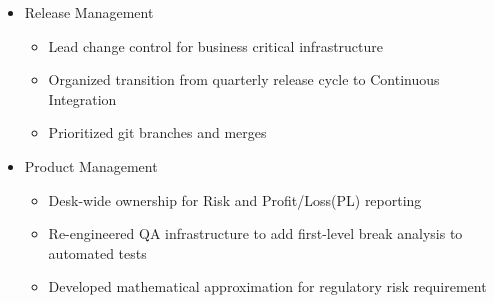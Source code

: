 \begin{itemize}
    \item Release Management
        \begin{itemize}
            \item Lead change control for business critical infrastructure
            \item Organized transition from quarterly release cycle to Continuous Integration
            \item Prioritized git branches and merges
        \end{itemize}

    \item{Product Management}
        \begin{itemize}
            \item Desk-wide ownership for Risk and Profit/Loss(PL) reporting
            \item Re-engineered QA infrastructure to add first-level break analysis to automated tests
            \item Developed mathematical approximation for regulatory risk requirement
        \end{itemize}


\end{itemize}
